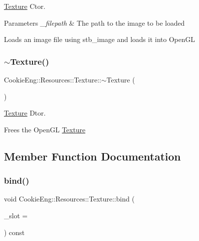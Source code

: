 \hyperlink{class_cookie_eng_1_1_resources_1_1_texture}{Texture} Ctor. 


\begin{DoxyParams}{Parameters}
{\em \+\_\+filepath} & The path to the image to be loaded\\
\hline
\end{DoxyParams}
Loads an image file using stb\+\_\+image and loads it into Open\+GL \mbox{\label{class_cookie_eng_1_1_resources_1_1_texture_ac5830da00fa12695714d1ed03d03a591}} 
\subsubsection{\texorpdfstring{$\sim$\+Texture()}{~Texture()}}
{\footnotesize\ttfamily Cookie\+Eng\+::\+Resources\+::\+Texture\+::$\sim$\+Texture (\begin{DoxyParamCaption}{ }\end{DoxyParamCaption})}



\hyperlink{class_cookie_eng_1_1_resources_1_1_texture}{Texture} Dtor. 

Frees the Open\+GL \hyperlink{class_cookie_eng_1_1_resources_1_1_texture}{Texture} 

\subsection{Member Function Documentation}
\mbox{\label{class_cookie_eng_1_1_resources_1_1_texture_a19f26d4ff9f73e05562e00532466f4df}} 
\subsubsection{\texorpdfstring{bind()}{bind()}}
{\footnotesize\ttfamily void Cookie\+Eng\+::\+Resources\+::\+Texture\+::bind (\begin{DoxyParamCaption}\item[{G\+Luint}]{\+\_\+slot = {} }\end{DoxyParamCaption}) const}




